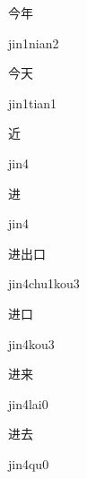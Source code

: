 \begin{multicols*}{2}
\begin{verbete}{今年}
\begin{pronuncia}{jin1nian2}
\end{pronuncia}
\end{verbete}

\begin{verbete}{今天}
\begin{pronuncia}{jin1tian1}
\end{pronuncia}
\end{verbete}

\begin{verbete}[jin4]{近}
\begin{pronuncia}{jin4}
\end{pronuncia}
\end{verbete}

\begin{verbete}[jin4]{进}
\begin{pronuncia}{jin4}
\end{pronuncia}
\end{verbete}

\begin{verbete}{进出口}
\begin{pronuncia}{jin4chu1kou3}
\end{pronuncia}
\end{verbete}

\begin{verbete}{进口}
\begin{pronuncia}{jin4kou3}
\end{pronuncia}
\end{verbete}

\begin{verbete}{进来}
\begin{pronuncia}{jin4lai0}
\end{pronuncia}
\end{verbete}

\begin{verbete}[jin4qu0]{进去}
\begin{pronuncia}{jin4qu0}
\end{pronuncia}
\end{verbete}


\end{multicols*}
